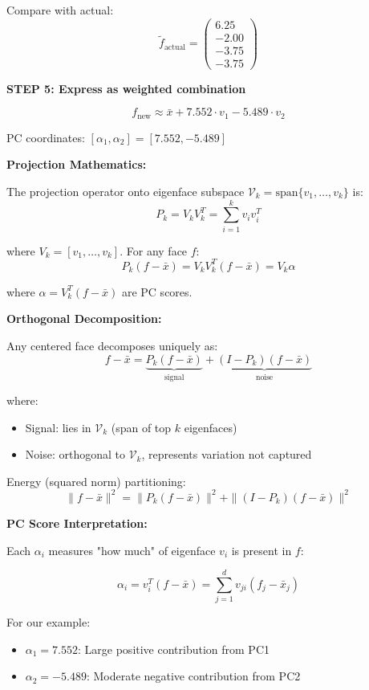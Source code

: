 \documentclass[12pt]{article}
\begin{document}
\begin{solution}
Compare with actual:
\[
\tilde{f}_{\text{actual}} = \begin{pmatrix}
6.25 \\
-2.00 \\
-3.75 \\
-3.75
\end{pmatrix}
\]

\textbf{STEP 5: Express as weighted combination}

\[
\boxed{
f_{\text{new}} \approx \bar{x} + 7.552 \cdot v_1 - 5.489 \cdot v_2
}
\]

PC coordinates: $[\alpha_1, \alpha_2] = [7.552, -5.489]$

\end{solution}

\begin{explanation}

\textbf{Projection Mathematics:}

The projection operator onto eigenface subspace $\mathcal{V}_k = \text{span}\{v_1, \ldots, v_k\}$ is:
\[
P_k = V_k V_k^T = \sum_{i=1}^k v_i v_i^T
\]

where $V_k = [v_1, \ldots, v_k]$. For any face $f$:
\[
P_k(f - \bar{x}) = V_k V_k^T (f - \bar{x}) = V_k \alpha
\]

where $\alpha = V_k^T(f - \bar{x})$ are PC scores.

\textbf{Orthogonal Decomposition:}

Any centered face decomposes uniquely as:
\[
f - \bar{x} = \underbrace{P_k(f - \bar{x})}_{\text{signal}} + \underbrace{(I - P_k)(f - \bar{x})}_{\text{noise}}
\]

where:
\begin{itemize}
    \item Signal: lies in $\mathcal{V}_k$ (span of top $k$ eigenfaces)
    \item Noise: orthogonal to $\mathcal{V}_k$, represents variation not captured
\end{itemize}

Energy (squared norm) partitioning:
\[
\|f - \bar{x}\|^2 = \|P_k(f - \bar{x})\|^2 + \|(I - P_k)(f - \bar{x})\|^2
\]

\textbf{PC Score Interpretation:}

Each $\alpha_i$ measures "how much" of eigenface $v_i$ is present in $f$:

\[
\alpha_i = v_i^T(f - \bar{x}) = \sum_{j=1}^d v_{ji}(f_j - \bar{x}_j)
\]

For our example:
\begin{itemize}
    \item $\alpha_1 = 7.552$: Large positive contribution from PC1
    \item $\alpha_2 = -5.489$: Moderate negative contribution from PC2
\end{itemize}


\end{explanation}
\end{document}
